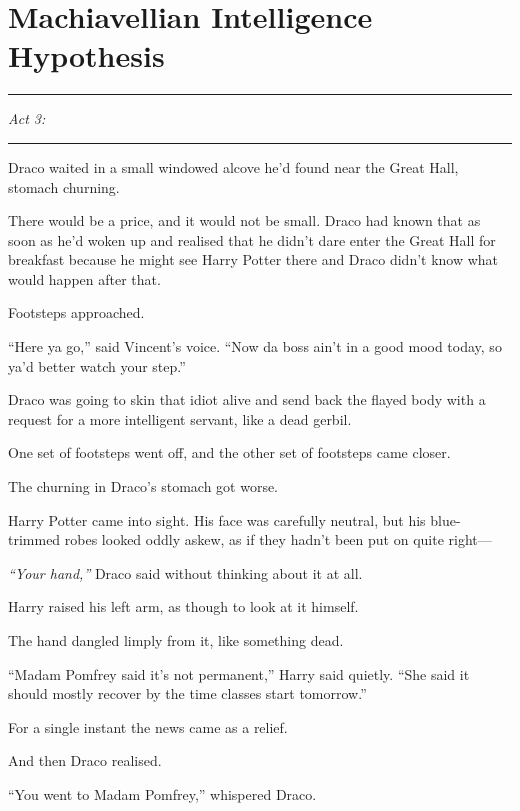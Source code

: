 \chapter{Machiavellian Intelligence
Hypothesis}\label{machiavellian-intelligence-hypothesis}

\begin{center}\rule{3in}{0.4pt}\end{center}

\emph{Act 3:}

\begin{center}\rule{3in}{0.4pt}\end{center}

Draco waited in a small windowed alcove he'd found near the Great Hall,
stomach churning.

There would be a price, and it would not be small. Draco had known that
as soon as he'd woken up and realised that he didn't dare enter the
Great Hall for breakfast because he might see Harry Potter there and
Draco didn't know what would happen after that.

Footsteps approached.

``Here ya go,'' said Vincent's voice. ``Now da boss ain't in a good mood
today, so ya'd better watch your step.''

Draco was going to skin that idiot alive and send back the flayed body
with a request for a more intelligent servant, like a dead gerbil.

One set of footsteps went off, and the other set of footsteps came
closer.

The churning in Draco's stomach got worse.

Harry Potter came into sight. His face was carefully neutral, but his
blue-trimmed robes looked oddly askew, as if they hadn't been put on
quite right---

\emph{``Your hand,''} Draco said without thinking about it at all.

Harry raised his left arm, as though to look at it himself.

The hand dangled limply from it, like something dead.

``Madam Pomfrey said it's not permanent,'' Harry said quietly. ``She
said it should mostly recover by the time classes start tomorrow.''

For a single instant the news came as a relief.

And then Draco realised.

``You went to Madam Pomfrey,'' whispered Draco.

